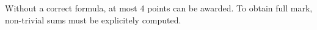 {Without a correct formula, at most 4 points can be awarded. To obtain full mark, non-trivial sums must be explicitely computed.



  

    

    
    
    
    
    
}
